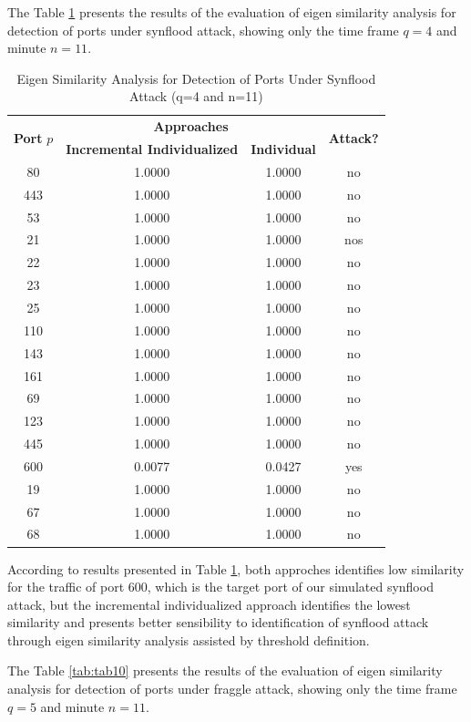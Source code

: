 \documentclass{bmcart}
\begin{document}
The Table \ref{tab:tab9} presents the results of the evaluation of eigen similarity analysis for detection of ports under synflood attack, showing only the time frame $q=4$ and minute $n=11$.

\begin{table}[h!]
  \centering
  \footnotesize
  \caption{Eigen Similarity Analysis for Detection of Ports Under Synflood Attack (q=4 and n=11)}
  \label{tab:tab9}
  \begin{tabular}{ c c c c }
	\toprule
	\multirow{2}{*}{\textbf{Port} $p$}   &\multicolumn{2}{c}{\textbf{Approaches}} &\multirow{2}{*}{\textbf{Attack?}}\\ 
			\hhline{~--~}
			&\textbf{Incremental Individualized} &\textbf{Individual}\\
	\midrule
	80 &1.0000 &1.0000 &no \\
	443 &1.0000 &1.0000 &no \\
	53 &1.0000 &1.0000 &no \\
	21 &1.0000 &1.0000 &nos \\
	22 &1.0000 &1.0000 &no \\
	23 &1.0000 &1.0000 &no \\
	25 &1.0000 &1.0000 &no \\
	110 &1.0000 &1.0000 &no \\
	143 &1.0000 &1.0000 &no \\
	161 &1.0000 &1.0000 &no \\
	69 &1.0000 &1.0000 &no \\
	123 &1.0000 &1.0000 &no \\
	445 &1.0000 &1.0000 &no \\
	600 &0.0077 &0.0427 &yes \\
	19 &1.0000 &1.0000 &no \\
	67 &1.0000 &1.0000 &no \\
	68 &1.0000 &1.0000 &no \\
    \bottomrule
  \end{tabular}
\end{table}

According to results presented in Table \ref{tab:tab9}, both approches identifies low similarity for the traffic of port 600, which is the target port of our simulated synflood attack, but the incremental individualized approach identifies the lowest similarity and presents better sensibility to identification of synflood attack through eigen similarity analysis assisted by threshold definition.

The Table \ref{tab:tab10} presents the results of the evaluation of eigen similarity analysis for detection of ports under fraggle attack, showing only the time frame $q=5$ and minute $n=11$.
\end{document}
